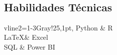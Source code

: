 \documentclass[a3paper,11pt]{article}
\begin{document}
\begin{adjustbox}{valign=t}
\begin{minipage}{0.6\textwidth}
\begin{description}
	\\
	
\end{description}

\MySkip
\begin{multicols}{2}
\section*{Habilidades Técnicas}
\begin{tblr}{
vline{2}={1-3}{Gray!25,1pt},
}
	Python & R \\
	\LaTeX & Excel \\
	SQL	& Power BI \\
\end{tblr}

\vfill\null \columnbreak  %


\end{multicols}
\end{minipage}
\end{adjustbox}
\end{document}
